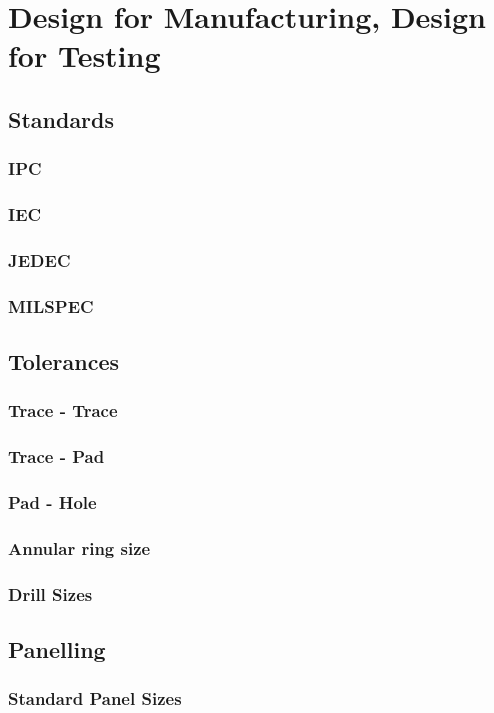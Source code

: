 
\chapter{Design for Manufacturing, Design for Testing}

\section{Standards}
\subsection{IPC}
\subsection{IEC}
\subsection{JEDEC}
\subsection{MILSPEC}

\section{Tolerances}
\subsection{Trace - Trace}
\subsection{Trace - Pad}
\subsection{Pad - Hole}
\subsection{Annular ring size}
\subsection{Drill Sizes}

\section{Panelling}
\subsection{Standard Panel Sizes}

